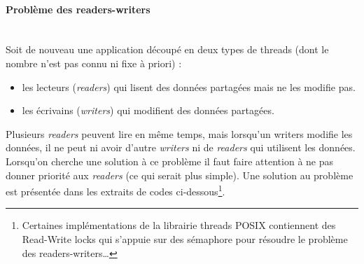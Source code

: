 \paragraph{Problème des readers-writers}~\\
Soit de nouveau une application découpé en deux types de threads (dont le nombre n'est pas connu ni fixe à priori) :
\begin{itemize}
  \item les lecteurs (\textit{readers}) qui lisent des données partagées mais ne les modifie pas.
  \item les écrivains (\textit{writers}) qui modifient des données partagées.
\end{itemize}
Plusieurs \textit{readers} peuvent lire en même temps, mais lorsqu'un writers modifie les données, il ne peut ni avoir d'autre \textit{writers} ni de \textit{readers} qui utilisent les données.
Lorsqu'on cherche une solution à ce problème il faut faire attention à ne pas donner priorité aux \textit{readers} (ce qui serait plus simple).
Une solution au problème est présentée dans les extraits de codes ci-dessous\footnote{Certaines implémentations de la librairie threads POSIX contiennent des Read-Write locks qui s'appuie sur des sémaphore pour résoudre le problème des readers-writers…}.
